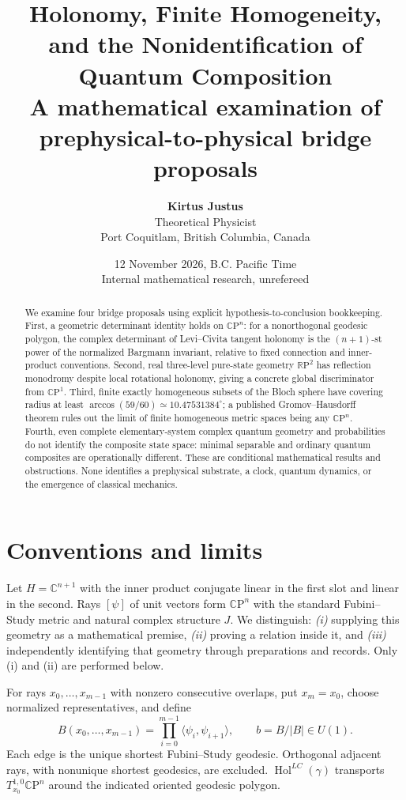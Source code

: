 \documentclass[11pt,letterpaper]{article}
\title{\bfseries Holonomy, Finite Homogeneity, and the Nonidentification of Quantum Composition\\[3pt]\large A mathematical examination of prephysical-to-physical bridge proposals}
\author{\textbf{Kirtus Justus}\\Theoretical Physicist\\Port Coquitlam, British Columbia, Canada}
\date{12 November 2026, B.C. Pacific Time\\\small Internal mathematical research, unrefereed}
\newcommand{\CP}{\mathbb C\mathrm P}
\newcommand{\RP}{\mathbb R\mathrm P}
\begin{document}
\maketitle
\begin{abstract}
We examine four bridge proposals using explicit hypothesis-to-conclusion bookkeeping. First, a geometric determinant identity holds on \(\CP^n\): for a nonorthogonal geodesic polygon, the complex determinant of Levi--Civita tangent holonomy is the \((n+1)\)-st power of the normalized Bargmann invariant, relative to fixed connection and inner-product conventions. Second, real three-level pure-state geometry \(\RP^2\) has reflection monodromy despite local rotational holonomy, giving a concrete global discriminator from \(\CP^1\). Third, finite exactly homogeneous subsets of the Bloch sphere have covering radius at least \(\arccos(59/60)\simeq10.47531384^\circ\); a published Gromov--Hausdorff theorem rules out the limit of finite homogeneous metric spaces being any \(\CP^n\). Fourth, even complete elementary-system complex quantum geometry and probabilities do not identify the composite state space: minimal separable and ordinary quantum composites are operationally different. These are conditional mathematical results and obstructions. None identifies a prephysical substrate, a clock, quantum dynamics, or the emergence of classical mechanics.
\end{abstract}

\section{Conventions and limits}
Let \(H=\mathbb C^{n+1}\) with the inner product conjugate linear in the first slot and linear in the second. Rays \([\psi]\) of unit vectors form \(\CP^n\) with the standard Fubini--Study metric and natural complex structure \(J\). We distinguish: \emph{(i)} supplying this geometry as a mathematical premise, \emph{(ii)} proving a relation inside it, and \emph{(iii)} independently identifying that geometry through preparations and records. Only (i) and (ii) are performed below.

For rays \(x_0,\ldots,x_{m-1}\) with nonzero consecutive overlaps, put \(x_m=x_0\), choose normalized representatives, and define
\begin{equation}\label{eq:B}
B(x_0,\ldots,x_{m-1})=\prod_{i=0}^{m-1}\langle\psi_i,\psi_{i+1}\rangle,\qquad b=B/|B|\in U(1).
\end{equation}
Each edge is the unique shortest Fubini--Study geodesic. Orthogonal adjacent rays, with nonunique shortest geodesics, are excluded. \(\operatorname{Hol}^{LC}(\gamma)\) transports \(T^{1,0}_{x_0}\CP^n\) around the indicated oriented geodesic polygon.
\end{document}
